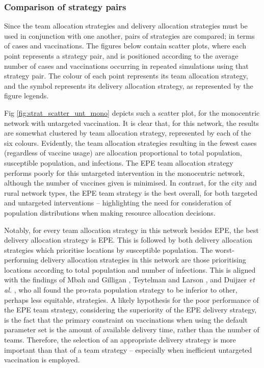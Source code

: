 \documentclass[10pt,letterpaper]{article}
\begin{document}
\subsubsection*{Comparison of strategy pairs}
Since the team allocation strategies and delivery allocation strategies must be used in conjunction with one another, pairs of strategies are compared; in terms of cases and vaccinations. The figures below contain scatter plots, where each point represents a strategy pair, and is positioned according to the average number of cases and vaccinations occurring in repeated simulations using that strategy pair. The colour of each point represents its team allocation strategy, and the symbol represents its delivery allocation strategy, as represented by the figure legends.

Fig \ref{fig:strat_scatter_unt_mono} depicts such a scatter plot, for the monocentric network with untargeted vaccination. It is clear that, for this network, the results are somewhat clustered by team allocation strategy, represented by each of the six colours. Evidently, the team allocation strategies resulting in the fewest cases (regardless of vaccine usage) are allocation proportional to total population, susceptible population, and infections. The EPE team allocation strategy performs poorly for this untargeted intervention in the monocentric network, although the number of vaccines given is minimised. In contrast, for the city and rural network types, the EPE team strategy is the best overall, for both targeted and untargeted interventions -- highlighting the need for consideration of population distributions when making resource allocation decisions. 

Notably, for every team allocation strategy in this network besides EPE, the best delivery allocation strategy is EPE. This is followed by both delivery allocation strategies which prioritise locations by susceptible population. The worst-performing delivery allocation strategies in this network are those prioritising locations according to total population and number of infections. This is aligned with the findings of Mbah and Gilligan \cite{mbah2011resource}, Teytelman and Larson \cite{teytelman2013multiregional}, and Duijzer \textit{et al.} \cite{duijzer2018dose}, who all found the pro-rata population strategy to be inferior to other, perhaps less equitable, strategies. A likely hypothesis for the poor performance of the EPE team strategy, considering the superiority of the EPE delivery strategy, is the fact that the primary constraint on vaccinations when using the default parameter set is the amount of available delivery time, rather than the number of teams. Therefore, the selection of an appropriate delivery strategy is more important than that of a team strategy -- especially when inefficient untargeted vaccination is employed.
\end{document}
